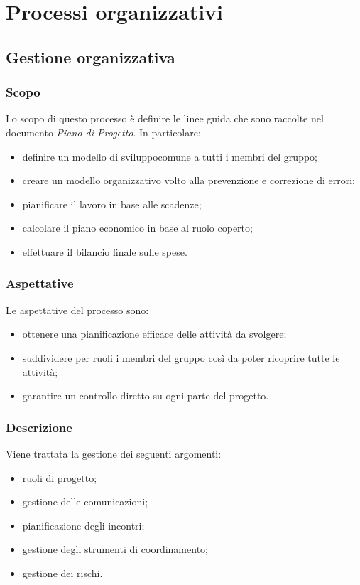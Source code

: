 \section{Processi organizzativi}
	\subsection{Gestione organizzativa}
		\subsubsection{Scopo}

		Lo scopo di questo processo è definire le linee guida che sono raccolte nel documento \textit{Piano di Progetto}. In particolare:
		\begin{itemize}
			\item definire un modello di sviluppo\glosp comune a tutti i membri del gruppo; 
			\item creare un modello organizzativo volto alla prevenzione e correzione di errori;
			\item pianificare il lavoro in base alle scadenze;
			\item calcolare il piano economico in base al ruolo coperto;
			\item effettuare il bilancio finale sulle spese.
		\end{itemize}

		\subsubsection{Aspettative}
		Le aspettative del processo sono:
		\begin{itemize}
			\item ottenere una pianificazione efficace delle attività da svolgere;
			\item suddividere per ruoli i membri del gruppo così da poter ricoprire tutte le attività;
			\item garantire un controllo diretto su ogni parte del progetto.
		\end{itemize}
		\subsubsection{Descrizione}
		Viene trattata la gestione dei seguenti argomenti:
		\begin{itemize}
			\item ruoli di progetto;
			\item gestione delle comunicazioni;
			\item pianificazione degli incontri;
			\item gestione degli strumenti di coordinamento;
			\item gestione dei rischi.
		\end{itemize}
